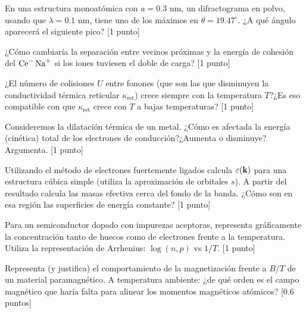 \begin{ejercicio}
	En una estructura \fcc monoatómica con $a=0.3$ nm, un difractograma en polvo, usando que $\lambda=0.1$ nm, tiene uno de los máximos en $\theta=19.47^\circ$. ¿A qué ángulo aparecerá el siguiente pico?  [1 punto]
\end{ejercicio}

\begin{ejercicio}
	¿Cómo cambiaría la separación entre vecinos próximas y la energía de cohesión del $\ce{Ce^- Na^+}$ si los iones tuviesen el doble de carga?  [1 punto]
\end{ejercicio}

\begin{ejercicio}
	¿El número de colisiones $U$ entre fonones (que son las que disminuyen la conductividad térmica reticular $\kappa_{\text{ret}}$) crece siempre con la temperatura $T$?¿Es eso compatible con que $\kappa_{\text{ret}}$ crece con $T$ a bajas temperaturas?  [1 punto]
\end{ejercicio}

\begin{ejercicio}
	Consideremos la dilatación térmica de un metal. ¿Cómo es afectada la energía (cinética) total de los electrones de conducción?¿Aumenta o disminuye? Argumenta. [1 punto]
\end{ejercicio}

\begin{ejercicio}
	Utilizando el método de electrones fuertemente ligados calcula $\varepsilon(\mathbf{k})$ para una estructura cúbica simple (utiliza la aproximación de orbitales $s$). A partir del resultado calcula las masas efectiva cerca del fondo de la banda. ¿Cómo son en esa región las superficies de energía constante? [1 punto]
\end{ejercicio}
\begin{ejercicio}
	Para un semiconductor dopado con impurezas aceptoras, representa gráficamente la concentración tanto de huecos como de electrones frente a la temperatura. Utiliza la representación de Arrhenius: $\log (n,p) $ vs $1/T$. [1 punto]
\end{ejercicio}

\begin{ejercicio}
	Representa (y justifica) el comportamiento de la magnetización frente a $B/T$ de un material paramagnético. A temperatura ambiente: ¿de qué orden es el campo magnético que haría falta para alinear los momentos magnéticos atómicos? [0.6 puntos]
\end{ejercicio}

